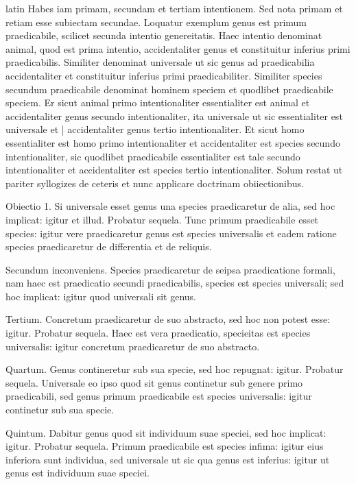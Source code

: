 \begin{otherlanguage*}{latin}
\pstart
  Habes iam primam, secundam et tertiam intentionem. Sed nota primam et retiam esse subiectam secundae. Loquatur exemplum genus est primum praedicabile, scilicet secunda intentio genereitatis. Haec intentio denominat animal, quod est prima intentio, accidentaliter genus et constituitur inferius primi praedicabilis. Similiter denominat universale ut sic genus ad praedicabilia accidentaliter et constituitur inferius primi praedicabiliter. Similiter species secundum praedicabile denominat hominem speciem et quodlibet praedicabile speciem. Er sicut animal primo intentionaliter essentialiter est animal et accidentaliter genus secundo intentionaliter, ita universale ut sic essentialiter est universale et \textnormal{|} accidentaliter genus tertio intentionaliter. Et sicut homo essentialiter est homo primo intentionaliter et accidentaliter est species secundo intentionaliter, sic quodlibet praedicabile essentialiter est tale secundo intentionaliter et accidentaliter est species tertio intentionaliter. Solum restat ut pariter syllogizes de ceteris et nunc applicare doctrinam obiiectionibus. 
\pend

\pstart
  Obiectio 1. Si universale esset genus una species praedicaretur de alia, sed hoc implicat: igitur et illud. Probatur sequela. Tunc primum praedicabile esset species: igitur vere praedicaretur genus est species universalis et eadem ratione species praedicaretur de differentia et de reliquis. 
\pend

\pstart
  Secundum inconveniens. Species praedicaretur de seipsa praedicatione formali, nam haec est praedicatio secundi praedicabilis, species est species universali; sed hoc implicat: igitur quod universali sit genus. 
\pend

\pstart
  Tertium. Concretum praedicaretur de suo abstracto, sed hoc non potest esse: igitur. Probatur sequela. Haec est vera praedicatio, specieitas est species universalis: igitur concretum praedicaretur de suo abstracto. 
\pend

\pstart
  Quartum. Genus contineretur sub sua specie, sed hoc repugnat: igitur. Probatur sequela. Universale eo ipso quod sit genus continetur sub genere primo praedicabili, sed genus primum praedicabile est species universalis: igitur continetur sub sua specie. 
\pend

\pstart
  Quintum. Dabitur genus quod sit individuum suae speciei, sed hoc implicat: igitur. Probatur sequela. Primum praedicabile est species infima: igitur eius inferiora sunt individua, sed universale ut sic qua genus est inferius: igitur ut genus est individuum suae speciei. 
\pend


\end{otherlanguage*}
